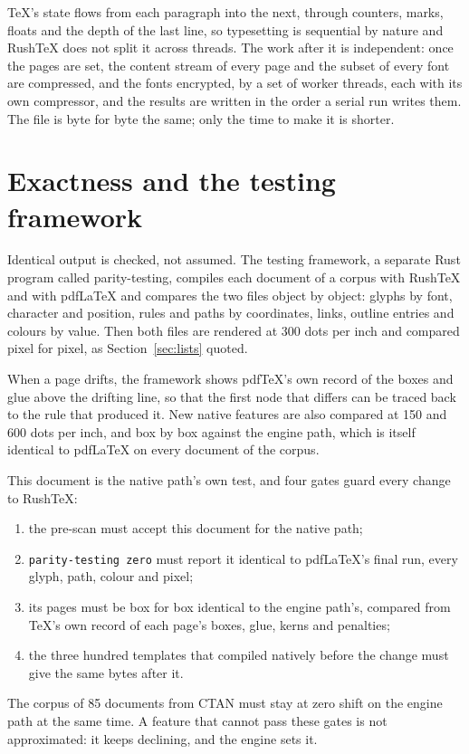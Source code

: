 \documentclass{article}
\numberwithin{equation}{section}
\theoremstyle{definition}
\theoremstyle{remark}
\begin{document}
\TeX's state flows from each paragraph into the next, through counters, marks, floats
and the depth of the last line, so typesetting is sequential by nature and RushTeX does
not split it across threads. The work after it is independent: once the pages are set,
the content stream of every page and the subset of every font are compressed, and the
fonts encrypted, by a set of worker threads, each with its own compressor, and the
results are written in the order a serial run writes them. The file is byte for byte the
same; only the time to make it is shorter.

\section{Exactness and the testing framework}\label{sec:testing}

Identical output is checked, not assumed. The testing framework, a separate Rust
program called parity-testing, compiles each document of a corpus with RushTeX and with
pdfLaTeX and compares the two files object by object: glyphs by font, character and
position, rules and paths by coordinates, links, outline entries and colours by value.
Then both files are rendered at 300 dots per inch and compared pixel for pixel, as
Section~\ref{sec:lists} quoted.

When a page drifts, the framework shows pdfTeX's own record of the boxes and glue above
the drifting line, so that the first node that differs can be traced back to the rule
that produced it. New native features are also compared at 150 and 600 dots per inch,
and box by box against the engine path, which is itself identical to pdfLaTeX on every
document of the corpus.

This document is the native path's own test, and four gates guard every change to
RushTeX:
\begin{enumerate}
  \item the pre-scan must accept this document for the native path;
  \item \texttt{parity-testing zero} must report it identical to pdfLaTeX's final run,
        every glyph, path, colour and pixel;
  \item its pages must be box for box identical to the engine path's, compared from
        \TeX's own record of each page's boxes, glue, kerns and penalties;
  \item the three hundred templates that compiled natively before the change must give
        the same bytes after it.
\end{enumerate}
The corpus of 85 documents from CTAN must stay at zero shift on the engine path at the
same time. A feature that cannot pass these gates is not approximated: it keeps
declining, and the engine sets it.
\end{document}

